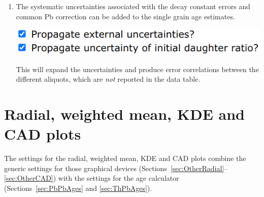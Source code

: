 \begin{refsection}
\begin{enumerate}
\item The systematic uncertainties associated with the decay constant
  errors and common Pb correction can be added to the single grain age
  estimates.

\noindent\begin{minipage}[t]{.5\linewidth}
\strut\vspace*{-\baselineskip}\newline
\includegraphics[width=\linewidth]{../figures/projexterr.png}
\end{minipage}
\begin{minipage}[t]{.5\linewidth}
  This will expand the uncertainties and produce error correlations
  between the different aliquots, which are \emph{not} reported in the
  data table.
\end{minipage}
  
\end{enumerate}

\section{Radial, weighted mean, KDE and CAD plots}
\label{sec:ThPbPbOtherPlots}

The settings for the radial, weighted mean, KDE and CAD plots combine
the generic settings for those graphical devices
(Sections~\ref{sec:OtherRadial}--\ref{sec:OtherCAD}) with the settings
for the age calculator (Sections~\ref{sec:PbPbAges} and
\ref{sec:ThPbAges}).\\


\end{refsection}
